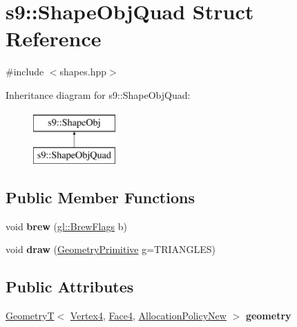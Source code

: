 \hypertarget{structs9_1_1ShapeObjQuad}{\section{s9\-:\-:\-Shape\-Obj\-Quad \-Struct \-Reference}
\label{structs9_1_1ShapeObjQuad}
}


{\ttfamily \#include $<$shapes.\-hpp$>$}

\-Inheritance diagram for s9\-:\-:\-Shape\-Obj\-Quad\-:\begin{figure}[H]
\begin{center}
\leavevmode
\includegraphics[height=2.000000cm]{structs9_1_1ShapeObjQuad}
\end{center}
\end{figure}
\subsection*{\-Public \-Member \-Functions}
\begin{DoxyCompactItemize}
\item 
\hypertarget{structs9_1_1ShapeObjQuad_aac2368d50d2a0d14dd189dd100337f9e}{void {\bfseries brew} (\hyperlink{structs9_1_1gl_1_1BrewFlags}{gl\-::\-Brew\-Flags} b)}\label{structs9_1_1ShapeObjQuad_aac2368d50d2a0d14dd189dd100337f9e}

\item 
\hypertarget{structs9_1_1ShapeObjQuad_a515e13a9b5872d62fa0793b2bbb0908e}{void {\bfseries draw} (\hyperlink{namespaces9_ad57d1332f8fd67d23f6a1d3520ab785c}{\-Geometry\-Primitive} g=\-T\-R\-I\-A\-N\-G\-L\-E\-S)}\label{structs9_1_1ShapeObjQuad_a515e13a9b5872d62fa0793b2bbb0908e}

\end{DoxyCompactItemize}
\subsection*{\-Public \-Attributes}
\begin{DoxyCompactItemize}
\item 
\hypertarget{structs9_1_1ShapeObjQuad_ae7f0e624eac50f40414e33f633696a15}{\hyperlink{classs9_1_1GeometryT}{\-Geometry\-T}$<$ \hyperlink{structs9_1_1VertexT}{\-Vertex4}, \hyperlink{structs9_1_1FaceT}{\-Face4}, \*
\hyperlink{classs9_1_1AllocationPolicyNew}{\-Allocation\-Policy\-New} $>$ {\bfseries geometry}}\label{structs9_1_1ShapeObjQuad_ae7f0e624eac50f40414e33f633696a15}

\end{DoxyCompactItemize}


